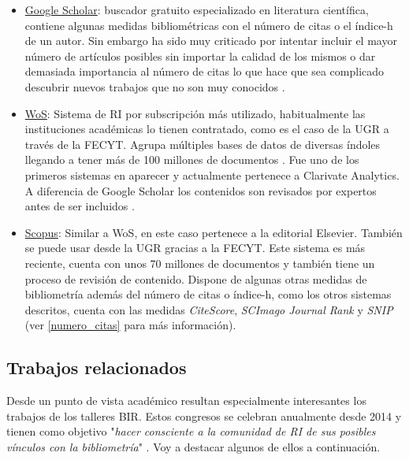 \begin{itemize}
	\item \href{https://scholar.google.es/}{Google Scholar}: buscador gratuito especializado en literatura científica, contiene algunas medidas bibliométricas con el número de citas o el índice-h de un autor. Sin embargo ha sido muy criticado por intentar incluir el mayor número de artículos posibles sin importar la calidad de los mismos \cite{googleScholarJunk} o dar demasiada importancia al número de citas lo que hace que sea complicado descubrir nuevos trabajos que no son muy conocidos \cite{Beel09}.
	
	\item \href{http://wos.fecyt.es/}{\acrfull{WoS}}: Sistema de RI por subscripción más utilizado, habitualmente las instituciones académicas lo tienen contratado, como es el caso de la \acrlong{UGR} a través de la \acrfull{FECYT}. Agrupa múltiples bases de datos de diversas índoles llegando a tener más de 100 millones de documentos \cite{WoS_Facts}. Fue uno de los primeros sistemas en aparecer y actualmente pertenece a Clarivate Analytics. A diferencia de Google Scholar los contenidos son revisados por expertos antes de ser incluidos \cite{WoS_Facts}. 
	
	\item \href{https://www.scopus.com/}{Scopus}: Similar a \acrshort{WoS}, en este caso pertenece a la editorial Elsevier. También se puede usar desde la \acrshort{UGR} gracias a la \acrshort{FECYT}. Este sistema es más reciente, cuenta con unos 70 millones de documentos \cite{scopus} y también tiene un proceso de revisión de contenido. Dispone de algunas otras medidas de bibliometría además del número de citas o índice-h, como los otros sistemas descritos, cuenta con las medidas \textit{CiteScore}, \textit{SCImago Journal Rank} y \textit{SNIP} (ver \ref{numero_citas} para más información). 
\end{itemize}

\subsection{Trabajos relacionados}
Desde un punto de vista académico resultan especialmente interesantes los trabajos de los talleres \acrfull{BIR}. Estos congresos se celebran anualmente desde 2014 y tienen como objetivo "\textit{hacer consciente a la comunidad de \acrshort{RI} de sus posibles vínculos con la bibliometría}" \cite{DBLP:conf/ecir/X14}. Voy a destacar algunos de ellos a continuación.

